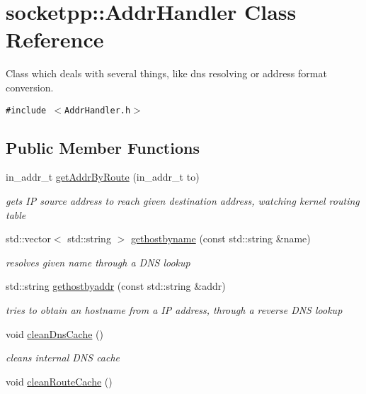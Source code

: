 \hypertarget{classsocketpp_1_1AddrHandler}{
\section{socketpp::AddrHandler Class Reference}
\label{classsocketpp_1_1AddrHandler}
}
Class which deals with several things, like dns resolving or address format conversion.  


{\tt \#include $<$AddrHandler.h$>$}

\subsection*{Public Member Functions}
\begin{CompactItemize}
\item 
in\_\-addr\_\-t \hyperlink{classsocketpp_1_1AddrHandler_79db1454cc9c12bbd44b526f61ff84fb}{getAddrByRoute} (in\_\-addr\_\-t to)
\begin{CompactList}\small\item\em gets IP source address to reach given destination address, watching kernel routing table \item\end{CompactList}\item 
std::vector$<$ std::string $>$ \hyperlink{classsocketpp_1_1AddrHandler_d840f7fee97d701511f09459bef35748}{gethostbyname} (const std::string \&name)
\begin{CompactList}\small\item\em resolves given name through a DNS lookup \item\end{CompactList}\item 
std::string \hyperlink{classsocketpp_1_1AddrHandler_2e9b9e6dc7ea4fc4a3500665b3f4062d}{gethostbyaddr} (const std::string \&addr)
\begin{CompactList}\small\item\em tries to obtain an hostname from a IP address, through a reverse DNS lookup \item\end{CompactList}\item 
\hypertarget{classsocketpp_1_1AddrHandler_89a2929af6c042fd7e16661303dfabcb}{
void \hyperlink{classsocketpp_1_1AddrHandler_89a2929af6c042fd7e16661303dfabcb}{cleanDnsCache} ()}
\label{classsocketpp_1_1AddrHandler_89a2929af6c042fd7e16661303dfabcb}

\begin{CompactList}\small\item\em cleans internal DNS cache \item\end{CompactList}\item 
\hypertarget{classsocketpp_1_1AddrHandler_b0830c79eecab9f9d5ac47c3d44cb1c9}{
void \hyperlink{classsocketpp_1_1AddrHandler_b0830c79eecab9f9d5ac47c3d44cb1c9}{cleanRouteCache} ()}
\label{classsocketpp_1_1AddrHandler_b0830c79eecab9f9d5ac47c3d44cb1c9}


\end{CompactItemize}
